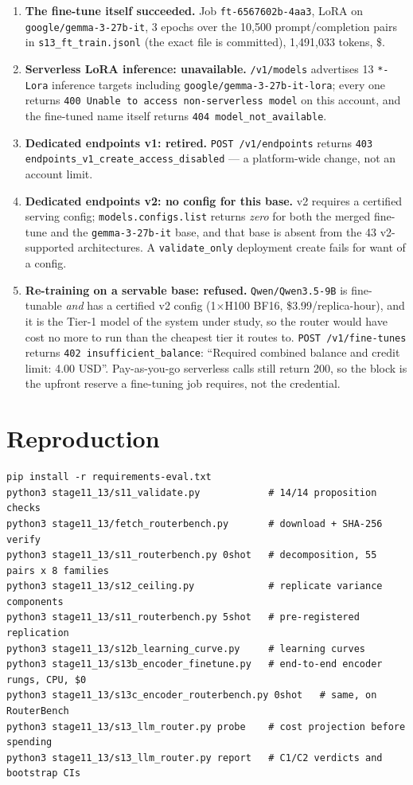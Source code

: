 \begin{sloppypar}
\begin{enumerate}\itemsep2pt
\item \textbf{The fine-tune itself succeeded.} Job \texttt{ft-6567602b-4aa3},
LoRA on \texttt{google/gemma-3-27b-it}, 3 epochs over the 10{,}500
prompt/completion pairs in \texttt{s13\_ft\_train.jsonl} (the exact file is
committed), 1{,}491{,}033 tokens, \$\FTTRAIN.
\item \textbf{Serverless LoRA inference: unavailable.} \texttt{/v1/models}
advertises 13 \texttt{*-Lora} inference targets including
\texttt{google/gemma-3-27b-it-lora}; every one returns \texttt{400 Unable to
access non-serverless model} on this account, and the fine-tuned name itself
returns \texttt{404 model\_not\_available}.
\item \textbf{Dedicated endpoints v1: retired.} \texttt{POST /v1/endpoints}
returns \texttt{403 endpoints\_v1\_create\_access\_disabled} --- a platform-wide
change, not an account limit.
\item \textbf{Dedicated endpoints v2: no config for this base.} v2 requires a
certified serving config; \texttt{models.configs.list} returns \emph{zero} for
both the merged fine-tune and the \texttt{gemma-3-27b-it} base, and that base is
absent from the 43 v2-supported architectures. A \texttt{validate\_only}
deployment create fails for want of a config.
\item \textbf{Re-training on a servable base: refused.}
\texttt{Qwen/Qwen3.5-9B} is fine-tunable \emph{and} has a certified v2 config
(1$\times$H100 BF16, \$3.99/replica-hour), and it is the Tier-1 model of the
system under study, so the router would have cost no more to run than the
cheapest tier it routes to. \texttt{POST /v1/fine-tunes} returns
\texttt{402 insufficient\_balance}: ``Required combined balance and credit
limit: 4.00 USD''. Pay-as-you-go serverless calls still return 200, so the block
is the upfront reserve a fine-tuning job requires, not the credential.
\end{enumerate}
\end{sloppypar}

\section{Reproduction}\label{app:repro}

\begin{verbatim}
pip install -r requirements-eval.txt
python3 stage11_13/s11_validate.py            # 14/14 proposition checks
python3 stage11_13/fetch_routerbench.py       # download + SHA-256 verify
python3 stage11_13/s11_routerbench.py 0shot   # decomposition, 55 pairs x 8 families
python3 stage11_13/s12_ceiling.py             # replicate variance components
python3 stage11_13/s11_routerbench.py 5shot   # pre-registered replication
python3 stage11_13/s12b_learning_curve.py     # learning curves
python3 stage11_13/s13b_encoder_finetune.py   # end-to-end encoder rungs, CPU, $0
python3 stage11_13/s13c_encoder_routerbench.py 0shot   # same, on RouterBench
python3 stage11_13/s13_llm_router.py probe    # cost projection before spending
python3 stage11_13/s13_llm_router.py report   # C1/C2 verdicts and bootstrap CIs
\end{verbatim}

